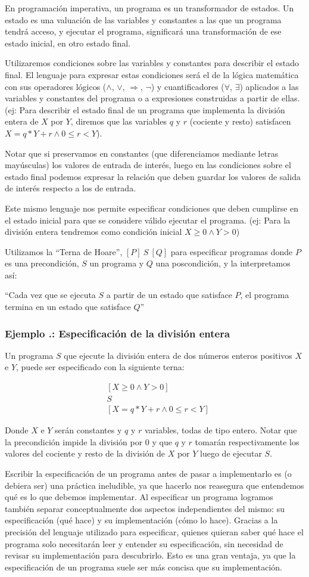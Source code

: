 \documentclass[12pt, a4paper, openany, fleqn]{book}
\newcounter{example}[chapter]
\renewcommand{\theexample}{\thechapter.\arabic{example}}
\newcommand{\example}[1]{
  \refstepcounter{example} %
  \subsubsection*{Ejemplo \theexample: #1}
}
\newcommand{\hoare}[3]{\ensuremath{[#1]\ #2\ [#3]}}
\newcommand{\verticalHoare}[3]{
    \begin{align*}
        &[#1]\\
        &#2\\
        &[#3]
    \end{align*}
}
\begin{document}
    En programación imperativa, un programa es un transformador de estados. Un estado es una valuación de las variables y constantes a las que un programa tendrá acceso, y ejecutar el programa, significará una transformación de ese estado inicial, en otro estado final.

    Utilizaremos condiciones sobre las variables y constantes para describir el estado final.
    El lenguaje para expresar estas condiciones será el de la lógica matemática con sus operadores lógicos ($\land$, $\lor$, $\Rightarrow$, $\neg$) y cuantificadores ($\forall$, $\exists$) aplicados a las variables y constantes del programa o a expresiones construidas a partir de ellas. (ej: Para describir el estado final de un programa que implementa la división entera de $X$ por $Y$, diremos que las variables $q$ y $r$ (cociente y resto) satisfacen $X = q * Y + r \land 0 \leqslant r < Y$).

    Notar que si preservamos en constantes (que diferenciamos mediante letras mayúsculas) los valores de entrada de interés, luego en las condiciones sobre el estado final podemos expresar la relación que deben guardar los valores de salida de interés respecto a los de entrada.

    Este mismo lenguaje nos permite especificar condiciones que deben cumplirse en el estado inicial para que se considere válido ejecutar el programa. (ej: Para la división entera tendremos como condición inicial $X \geqslant 0 \land Y > 0$)

    Utilizamos la ``Terna de Hoare'', \hoare{P}{S}{Q} para especificar programas donde $P$ es una precondición, $S$ un programa y $Q$ una poscondición, y la interpretamos así:

    ``Cada vez que se ejecuta $S$ a partir de un estado que satisface $P$, el programa termina en un estado que satisface $Q$''

    \example{Especificación de la división entera}
    \label{esp:division-entera}

    Un programa $S$ que ejecute la división entera de dos números enteros positivos $X$ e $Y$, puede ser especificado con la siguiente terna:
    \verticalHoare{X \geqslant 0 \land Y > 0}{S}{X = q * Y + r \land 0 \leqslant r < Y}
    Donde $X$ e $Y$ serán constantes y $q$ y $r$ variables, todas de tipo entero.
    Notar que la precondición impide la división por $0$ y que $q$ y $r$ tomarán respectivamente los valores del cociente y resto de la división de $X$ por $Y$ luego de ejecutar $S$.

    Escribir la especificación de un programa antes de pasar a implementarlo es (o debiera ser) una práctica ineludible, ya que hacerlo nos reasegura que entendemos qué es lo que debemos implementar.
    Al especificar un programa logramos también separar conceptualmente dos aspectos independientes del mismo: su especificación (qué hace) y su implementación (cómo lo hace).
    Gracias a la precisión del lenguaje utilizado para especificar, quienes quieran saber qué hace el programa solo necesitarán leer y entender su especificación, sin necesidad de revisar su implementación para descubrirlo. Esto es una gran ventaja, ya que la especificación de un programa suele ser más concisa que su implementación.
\end{document}
